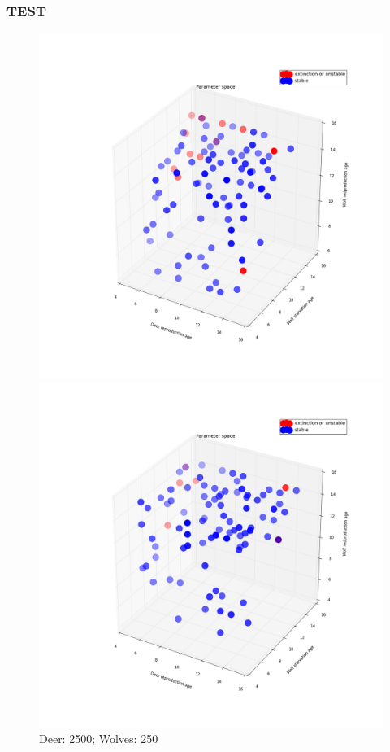 \documentclass{beamer}
\begin{document}
\frame
{
  \frametitle{TEST}
  \begin{figure}[ht]
  \centering
                \begin{minipage}[b]{.3\linewidth}
                        \includegraphics[width = 1\linewidth]{./pics/Restricted_Parameter_space_d2500_w250.png}
                    \caption{\tiny{Deer: 2500; Wolves: 250}}
                \end{minipage}
                \quad
                \begin{minipage}[b]{.3\linewidth}
                \includegraphics[width = 1\linewidth]{./pics/Restricted_Parameter_space_d3000_w500.png}

\end{minipage}
\end{figure}}
\end{document}
